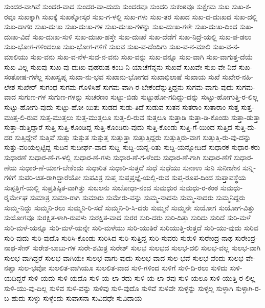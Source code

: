 ಸುಂದರ-ವಾಗಿವೆ
ಸುಂದರ-ವಾದ
ಸುಂದರ-ವಾ-ದುದು
ಸುಂದರವೂ
ಸುಂದರಿ
ಸುಕಂಠವೂ
ಸುಕ್ಷೇಮ
ಸುಖ
ಸುಖ-ಕ-ರವೂ
ಸುಖಕ್ಕಾಗಿ
ಸುಖಕ್ಕೆ
ಸುಖಕ್ಕೋಸ್ಕರ
ಸುಖ-ಗ-ಳಲ್ಲಿ
ಸುಖ-ಗಳು
ಸುಖ-ತರ
ಸುಖದ
ಸುಖ-ದ-ದುಃಖದ
ಸುಖ-ದಲ್ಲಿ
ಸುಖ-ದಾಗರ
ಸುಖ-ದುಃಖ
ಸುಖ-ದುಃಖ-ಗಳ
ಸುಖ-ದುಃಖ-ಗಳನ್ನು
ಸುಖ-ದುಃಖ-ಗಳೇ
ಸುಖ-ದುಃಖ-ದಿಂದ
ಸುಖ-ದುಃಖ-ವಿದೆ
ಸುಖ-ದುಃಖ-ಸುಳಿ
ಸುಖ-ದುಃಖ-ಹಸ್ತೇ
ಸುಖ-ದುಃಖೆ
ಸುಖ-ದೆಡೆಗೆ
ಸುಖ-ನಿದ್ರೆ-ಯಲ್ಲಿ
ಸುಖ-ಪ-ಡಲು
ಸುಖ-ಭೋಗ-ಗಳಿಂದಲೂ
ಸುಖ-ಭೋಗ-ಗಳಿಗೆ
ಸುಖವ
ಸುಖ-ವ-ದೆಂದಿಗು
ಸುಖ-ವ-ನ-ಮಾಲಿ
ಸುಖ-ವ-ನ-ಮಾಲಿಯು
ಸುಖ-ವನು
ಸುಖ-ವ-ನೆಳ-ಸುವ-ನ-ವನು
ಸುಖ-ವನ್ನು
ಸುಖ-ವನ್ನೂ
ಸುಖ-ವಾಗಿ
ಸುಖ-ವಾಗುತ್ತ-ದೆಯೆ
ಸುಖ-ವಿಲ್ಲ
ಸುಖವು
ಸುಖ-ವು-ದುಃಖ-ವುಹರುಷ-ಕಂಬ-ನಿ-ಯಾಚೆಗೆನ್ನನು
ಸುಖವೆ
ಸುಖವೇ
ಸುಖ-ವೇ-ನಿದೆ
ಸುಖ-ಸಂತೋಷ-ಗಳೆಲ್ಲ
ಸುಖಸ್ವಪ್ನ
ಸುಖಾ-ನು-ಭವ
ಸುಖಾನು-ಭೋಗದ
ಸುಖಾಭಿಲಾಷೆ
ಸುಖಾಯ
ಸುಖೆ
ಸುಖೇರ-ನಹಿ-ಲೇಶ
ಸುಖೇರ್
ಸುಗಂಧ
ಸುಗಮ-ಗೊಳಿಸಿಹೆ
ಸುಗಮ-ವಾಗಿ-ರ-ಬೇಕೆಂದೆನ್ನುತ್ತಿದ್ದನು
ಸುಗಮ-ವಾಗು-ವುದು
ಸುಗಮ-ವಾದ
ಸುಗುಣ-ಗಳ
ಸುಗುಣ-ಗಳನ್ನು
ಸುಚರಣಂ
ಸುಟ್ಟು-ಬಿಡು
ಸುಟ್ಟುಹೋ-ಗದಿದ್ದು-ದನ್ನು
ಸುಟ್ಟು-ಹೋಗುತ್ತಿ-ರ-ಲಿಲ್ಲ
ಸುಟ್ಟು-ಹೋಗು-ವುದು
ಸುಟ್ಟು-ಹೋ-ಯಿತು
ಸುಡದ
ಸುಡು-ತಿದೆ
ಸುಡುವ
ಸುತನ
ಸುತರಾಂ
ಸುತಾರಾಂ
ಸುತ್ತ
ಸುತ್ತ-ಮುತ್ತ-ಲಿ-ರುವ
ಸುತ್ತ-ಮುತ್ತಲು
ಸುತ್ತ-ಮುತ್ತಲೂ
ಸುತ್ತ-ಲಿ-ರುವ
ಸುತ್ತಲೂ
ಸುತ್ತಾಡಿ
ಸುತ್ತಾ-ಡಿ-ಕೊಂಡು
ಸುತ್ತಾ-ಡುತ್ತಾ
ಸುತ್ತಾ-ಡುತ್ತಿದ್ದಾರೆ
ಸುತ್ತಿ
ಸುತ್ತಿ-ಕೊಂಡಿದ್ದ
ಸುತ್ತಿ-ಕೊಂಡಿರು-ವುದು
ಸುತ್ತಿ-ಕೊಂಡು
ಸುತ್ತಿ-ಗೆ-ಯಿಂದ
ಸುತ್ತಿದ
ಸುತ್ತಿ-ದು-ದರ
ಸುತ್ತಿದ್ದೇನೆ
ಸುತ್ತಿವೆ
ಸುತ್ತು
ಸುತ್ತುತ
ಸುತ್ತುತ್ತ
ಸುತ್ತುತ್ತಾ
ಸುತ್ತುತ್ತಿದ್ದರು
ಸುತ್ತುತ್ತಿರು-ವಾಗ
ಸುತ್ತುತ್ತಿ-ರು-ವು-ದನ್ನು
ಸುತ್ತು-ವರಿಯಲ್ಪಟ್ಟಿದ್ದ
ಸುದಿನ
ಸುದೀರ್ಘ-ವಾದ
ಸುದ್ದಿ
ಸುದ್ದಿ-ಯನ್ನ-ರಿತು
ಸುದ್ದಿ-ಯನ್ನೋದಿದೆ
ಸುಧಾರಕ
ಸುಧಾರ-ಕರು
ಸುಧಾರಣೆ
ಸುಧಾರ-ಣೆ-ಗ-ಳಲ್ಲಿ
ಸುಧಾರ-ಣೆ-ಗಳು
ಸುಧಾರ-ಣೆ-ಗ-ಳೆಂದು
ಸುಧಾರ-ಣೆ-ಗಾಗಿ
ಸುಧಾರ-ಣೆಗೆ
ಸುಧಾರ-ಣೆಯ
ಸುಧಾರ-ಣೆ-ಯಾಗ-ಬೇಕೆಂದು
ಸುಧಾರಿತ
ಸುಧಾರಿ-ಸುತ್ತದೆ
ಸುಧೆ
ಸುಧೆಯು
ಸುನಾಉ
ಸುನಿ
ಸುನೀಚೇನ
ಸುನ್ನಿ-ಗಳಿಗೆ
ಸುಪರಿ-ಚಿತ-ರಾಗಿದ್ದಾರೆಯೋ
ಸುಪವಿತ್ರ
ಸುಪ್ತ
ಸುಪ್ತಪ್ರಜ್ಞೆ-ಯಲ್ಲಿ-ರುವ
ಸುಪ್ತ-ರೂಪ-ದಿಂದ
ಸುಪ್ತಾವಸ್ಥೆಯ
ಸುಪ್ಪತ್ತಿಗೆ-ಯಲ್ಲಿ
ಸುಪ್ರತಿಷ್ಠಿತ-ವಾಗಿತ್ತು
ಸುಬಲನು
ಸುಬೋಧಾ-ನಂದ
ಸುಮಧುರ
ಸುಮಧು-ರ-ಕಂಠ
ಸುಮಧು-ರೈರ್ಮೇಘ
ಸುಮಾತ್ರ
ಸುಮಾ-ರಾಗಿ
ಸುಮಾರು
ಸುಮೇರು-ವನ್ನು
ಸುಮ್ಮ-ನಾದನು
ಸುಮ್ಮ-ನಾದರು
ಸುಮ್ಮನಿದ್ದರು
ಸುಮ್ಮ-ನಿದ್ದು
ಸುಮ್ಮನಿ-ರಲು
ಸುಮ್ಮನಿ-ರಿ-ಸದೆ
ಸುಮ್ಮನಿ-ರಿ-ಸಿ-ದರು
ಸುಮ್ಮನೆ
ಸುಮ್ಮನೇ
ಸುಯೋಗ
ಸುಯೋಗ-ವಿತ್ತು
ಸುಯೋಗವೂ
ಸುರಕ್ಷಿತ-ಳಾಗಿ-ರುವಳು
ಸುರಕ್ಷಿತ-ವಾದ
ಸುರರ
ಸುರಿ-ದರು
ಸುರಿ-ದಿತ್ತು
ಸುರಿದು
ಸುರಿದೆ
ಸುರಿ-ಮಳೆ
ಸುರಿ-ಮಳೆ-ಯನ್ನೂ
ಸುರಿ-ಮಳೆ-ಯನ್ನೇ
ಸುರಿ-ಮಳೆಯು
ಸುರಿ-ಯುತಿರೆ
ಸುರಿಯುತ್ತಿ-ರುತ್ತದೆ
ಸುರಿ-ಯು-ವುದು
ಸುರಿವ
ಸುರಿ-ವುದು
ಸುರಿ-ವುದೊ
ಸುರಿಸಿ-ಕೊಂಡು
ಸುರಿಸಿದ
ಸುರಿ-ಸುತ್ತಿದ್ದ
ಸುರಿ-ಸುವರು
ಸುರುಳಿ
ಸುರೇಂದ್ರ-ನಾಥ
ಸುರೇಂದ್ರ-ನಾಥ-ಸೇನ್
ಸುರೇಶ-ಬಾಬು-ಗಳ
ಸುರೇ-ಶಮಿತ್ರ
ಸುರೇಶ್
ಸುಲಭ
ಸುಲಭದ
ಸುಲಭ-ದಲಿ
ಸುಲಭ-ವಲ್ಲ
ಸುಲಭ-ವಾಗಿ
ಸುಲಭ-ವಾಗಿದ್ದರೆ
ಸುಲಭ-ವಾಗಿಯೇ
ಸುಲಭ-ವಾಗು-ವುದು
ಸುಲಭ-ವಾದ
ಸುಲ-ಭವೆ
ಸುಲಭ-ವೆಂದು
ಸುಲಭ-ವೇ-ನಪ್ಪಾ
ಸುಲ-ಭವೋ
ಸುಲಲಿತ-ವಾಗಿಯೂ
ಸುಲಲಿತ-ವಾದ
ಸುಳಿ-ಗಳಿಂದ
ಸುಳಿಗೆ
ಸುಳಿ-ದಿ-ರಲು
ಸುಳಿದು
ಸುಳಿ-ಯದಿದ್ದರೆ
ಸುಳಿ-ಯದು
ಸುಳಿ-ಯದೊ
ಸುಳಿ-ಯ-ಲಾ-ರದು
ಸುಳಿ-ಯ-ಲಾ-ರವು
ಸುಳಿ-ಯಲೂ
ಸುಳಿ-ಯುತ್ತಿ-ರ-ಲಿಲ್ಲ
ಸುಳಿ-ಯು-ವು-ದಿಲ್ಲ
ಸುಳಿವ
ಸುಳಿ-ವನ್ನು
ಸುಳಿವು
ಸುಳಿ-ವುದೊ
ಸುಳಿವೆ
ಸುಳಿವೇ
ಸುಳ್ಳನ್ನು
ಸುಳ್ಳಲ್ಲ
ಸುಳ್ಳಾಗಿ
ಸುಳ್ಳಾಗಿ-ರ-ಬ-ಹುದು
ಸುಳ್ಳು
ಸುಳ್ಳೆಂದು
ಸುವಾಸನಾ
ಸುವಿದಧೇ
ಸುವಿದಾಯ
